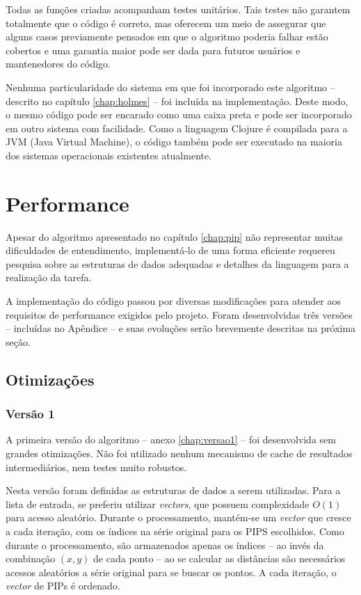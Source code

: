 Todas as funções criadas acompanham testes unitários. Tais testes não garantem totalmente que o código é  correto, mas oferecem um meio de assegurar que alguns casos previamente pensados em que o algoritmo poderia falhar estão cobertos e uma garantia maior pode ser dada para futuros usuários e mantenedores do código.

Nenhuma particularidade do sistema em que foi incorporado este algoritmo -- descrito no capítulo \ref{chap:holmes} -- foi incluída na implementação. Deste modo, o mesmo código pode ser encarado como uma caixa preta e pode ser incorporado em outro sistema com facilidade. Como a linguagem Clojure é compilada para a JVM (Java Virtual Machine), o código também pode ser executado na maioria dos sistemas operacionais existentes atualmente.

\section{Performance}
Apesar do algoritmo apresentado no capítulo \ref{chap:pip} não representar muitas dificuldades de entendimento, implementá-lo de uma forma eficiente requereu pesquisa sobre as estruturas de dados adequadas e detalhes da linguagem para a realização da tarefa.

A implementação do código passou por diversas modificações para atender aos requisitos de performance exigidos pelo projeto. Foram desenvolvidas três versões -- incluídas no Apêndice -- e suas evoluções serão brevemente descritas na próxima seção.

\subsection{Otimizações}
\subsubsection{Versão 1}
A primeira versão do algoritmo -- anexo \ref{chap:versao1} -- foi desenvolvida sem grandes otimizações. Não foi utilizado nenhum mecanismo de cache de resultados intermediários, nem testes muito robustos.

Nesta versão foram definidas as estruturas de dados a serem utilizadas. Para a lista de entrada, se preferiu utilizar \textit{vectors}, que possuem complexidade $O(1)$ para acesso aleatório. Durante o processamento, mantém-se um \textit{vector} que cresce a cada iteração, com os índices na série original para os PIPS escolhidos. Como durante o processamento, são armazenados apenas os índices -- ao invés da combinação $(x, y)$ de cada ponto -- ao se calcular as distâncias são necessários acessos aleatórios a série original para se buscar os pontos. A cada iteração, o \textit{vector} de PIPs é ordenado.

